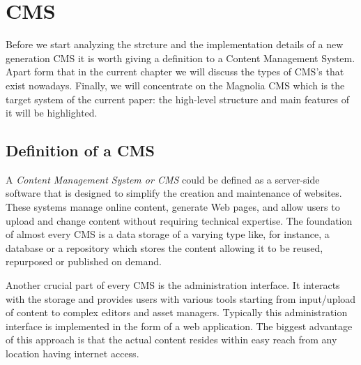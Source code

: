 \chapter{CMS}
Before we start analyzing the strcture and the implementation details of a new
generation CMS it is worth giving a definition to a Content Management System.
Apart form that in the current chapter we will discuss the types of CMS's that
exist nowadays. Finally, we will concentrate on the Magnolia CMS which is the
target system of the current paper: the high-level structure and main features
of it will be highlighted.

\section{Definition of a CMS}
A \emph{Content Management System or CMS} could be defined as a server-side
software that is designed to simplify the creation and maintenance of websites.
These systems manage online content, generate Web pages, and allow users to
upload and change content without requiring technical expertise. The foundation
of almost every CMS is a data storage of a varying type like, for instance, a
database or a repository which stores the content allowing it to be reused,
repurposed or published on demand.

Another crucial part of every CMS is the administration interface. It interacts
with the storage and provides users with various tools starting from
input/upload of content to complex editors and asset managers.
Typically this administration interface is implemented in the form of a web
application. The biggest advantage of this approach is that the actual content
resides within easy reach from any location having internet access.

